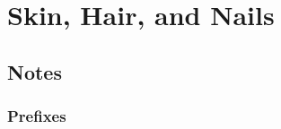 %
%
%
\chapter{Skin, Hair, and Nails}
\label{Skin} %








\abstract{}


\section{Notes}
\label{sec:NOTE4}

\subsection{Prefixes}

